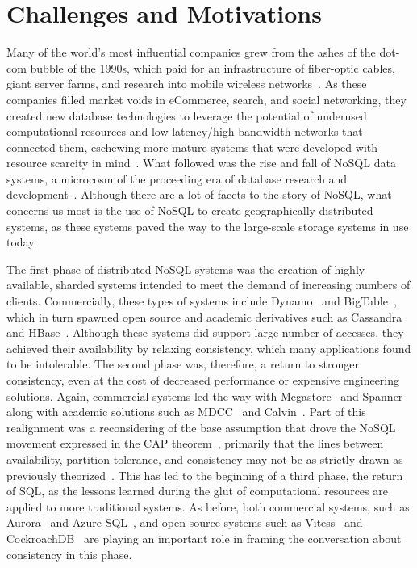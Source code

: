 
\renewcommand{\thechapter}{2}

\chapter{Challenges and Motivations}

Many of the world's most influential companies grew from the ashes of the dot-com bubble of the 1990s, which paid for an infrastructure of fiber-optic cables, giant server farms, and research into mobile wireless networks~\cite{casey_blockchain_2018}.
As these companies filled market voids in eCommerce, search, and social networking, they created new database technologies to leverage the potential of underused computational resources and low latency/high bandwidth networks that connected them, eschewing more mature systems that were developed with resource scarcity in mind~\cite{stonebraker_what_2005,stonebraker_mapreduce_2010}.
What followed was the rise and fall of NoSQL data systems, a microcosm of the proceeding era of database research and development~\cite{mohan_history_2013}.
Although there are a lot of facets to the story of NoSQL, what concerns us most is the use of NoSQL to create geographically distributed systems, as these systems paved the way to the large-scale storage systems in use today.

The first phase of distributed NoSQL systems was the creation of highly available, sharded systems intended to meet the demand of increasing numbers of clients.
Commercially, these types of systems include Dynamo~\cite{dynamo} and BigTable~\cite{bigtable}, which in turn spawned open source and academic derivatives such as Cassandra~\cite{cassandra} and HBase~\cite{hbase}.
Although these systems did support large number of accesses, they achieved their availability by relaxing consistency, which many applications found to be intolerable.
The second phase was, therefore, a return to stronger consistency, even at the cost of decreased performance or expensive engineering solutions.
Again, commercial systems led the way with Megastore~\cite{megastore} and Spanner~\cite{spanner} along with academic solutions such as MDCC~\cite{mdcc} and Calvin~\cite{calvindb,calvinfs}.
Part of this realignment was a reconsidering of the base assumption that drove the NoSQL movement expressed in the CAP theorem~\cite{cap}, primarily that the lines between availability, partition tolerance, and consistency may not be as strictly drawn as previously theorized~\cite{hat,consistency_tradeoffs}.
This has led to the beginning of a third phase, the return of SQL, as the lessons learned during the glut of computational resources are applied to more traditional systems.
As before, both commercial systems, such as Aurora~\cite{aurora} and Azure SQL~\cite{azure_sql_database}, and open source systems such as Vitess~\cite{vitess} and CockroachDB~\cite{cockroachdb} are playing an important role in framing the conversation about consistency in this phase.


